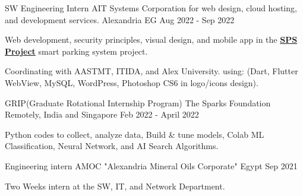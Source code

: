 \begin{cventries}

    \cventry
      {SW Engineering Intern} %
      {AIT Systems Corporation for web design, cloud hosting, and development services.} %
      {Alexandria EG} %
      {Aug 2022 - Sep 2022} %
      {
        \begin{cvitems} %
          \item {Web development, security principles, visual design, and mobile app in the \textbf{\textcolor{cyan}{\href{https://github.com/AsmaaJAH/Smart-Parking-System}{SPS Project}}} smart parking system project.}
          \item {Coordinating with AASTMT, ITIDA, and Alex University. using: (Dart, Flutter WebView, MySQL, WordPress, Photoshop CS6 in logo/icons design).}
    \end{cvitems}
      }
  
  \end{cventries}
\begin{cventries}

    \cventry
      {GRIP(Graduate Rotational Internship Program)} %
      {The Sparks Foundation} %
      {Remotely, India and Singapore} %
      {Feb 2022 - April 2022} %
      {
        \begin{cvitems} %
          \item {Python codes to collect, analyze data, Build \& tune models, Colab ML Classification, Neural Network, and AI Search Algorithms. }
    \end{cvitems}
      }
  
  \end{cventries}

\begin{cventries}

    \cventry
      {Engineering intern } %
      {AMOC "Alexandria Mineral Oils Corporate"} %
      {Egypt} %
      {Sep 2021} %
      {
        \begin{cvitems} %
          \item {Two Weeks intern at the SW, IT, and Network Department.}
    \end{cvitems}
      }
  
  \end{cventries}


